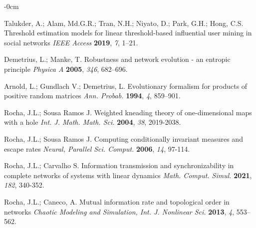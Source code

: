 \documentclass[journal,article,submit,pdftex,moreauthors]{Definitions/mdpi}
\begin{document}
\begin{adjustwidth}{-\extralength}{0cm}



%

\begin{thebibliography}{999}

 Talukder, A.; Alam, Md.G.R.; Tran, N.H.; Niyato, D.; Park, G.H.; Hong, C.S. Threshold estimation models for linear threshold-based influential user mining in social networks {\em IEEE Access} {\bf 2019}, {\em 7}, 1--21.

 Demetrius, L.; Manke, T. Robustness and network evolution - an entropic principle {\em Physica A} {\bf 2005}, {\em 346}, 682--696. 

 Arnold, L.; Gundlach V.; Demetrius, L. Evolutionary formalism for products of positive random matrices {\em Ann. Probab.} {\bf 1994}, {\em 4}, 859--901. 

 Rocha, J.L.; Sousa Ramos J. Weighted kneading theory of one-dimensional maps with a hole {\em Int. J. Math. Math. Sci.} {\bf 2004}, {\em 38}, 2019-2038.

 Rocha, J.L.; Sousa Ramos J. Computing conditionally invariant measures and escape rates {\em Neural, Parallel Sci. Comput.} {\bf 2006}, {\em 14}, 97-114.

 Rocha, J.L.; Carvalho S. Information transmission and synchronizability in complete networks of systems with linear dynamics {\em Math. Comput. Simul.} {\bf 2021}, {\em 182}, 340-352.

 Rocha, J.L.; Caneco, A. Mutual information rate and topological order in networks {\em Chaotic Modeling and Simulation, Int. J. Nonlinear Sci.} {\bf 2013}, {\em 4}, 553--562. 


\end{thebibliography}
\end{adjustwidth}
\end{document}
